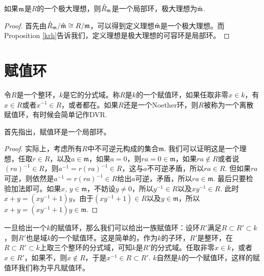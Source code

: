 
\begin{pro}
如果$\mathfrak{m}$是$R$的一个极大理想，则$\hat R_{\mathfrak{m}}$是一个局部环，极大理想为$\hat{\mathfrak{m}}$.
\end{pro}

\begin{proof}
	首先由$\hat R_{\mathfrak{m}}/\hat{\mathfrak{m}}\cong R/\mathfrak{m}$，可以得到定义理想$\hat {\mathfrak{m}}$是一个极大理想。而Proposition \ref{krh}告诉我们，定义理想是极大理想的可容环是局部环。
\end{proof}


\section{赋值环}

\para 令$R$是一个整环，$k$是它的分式域。称$R$是$k$的一个赋值环，如果任取非零$x\in k$，有$x\in R$或者$x^{-1}\in R$，或者都在。如果$R$还是一个Noether环，则$R$被称为一个离散赋值环，有时候会简单记作DVR.

首先指出，赋值环是一个局部环。

\begin{proof} 
	实际上，考虑所有$R$中不可逆元构成的集合$\mathfrak{m}$. 我们可以证明这是一个理想，任取$r\in R$，以及$a\in\mathfrak{m}$，如果$a=0$，则$ra=0\in \mathfrak{m}$，如果$ra\not\in R$或者说$(ra)^{-1}\in R$，则$a^{-1}=r(ra)^{-1}\in R$，这与$a$不可逆矛盾，所以$ra\in R$. 但如果$ra$可逆，则依然是$a^{-1}=r(ra)^{-1}\in R$给出$a$可逆，矛盾，所以$ra\in \mathfrak{m}$. 最后只要检验加法即可。如果$x$, $y\in\mathfrak{m}$，不妨设$y\neq 0$，所以$y^{-1}\in R$以及$xy^{-1}\in R$. 此时$x+y=(xy^{-1}+1)y$，由于$(xy^{-1}+1)\in R$以及$y\in\mathfrak{m}$，所以$x+y=(xy^{-1}+1)y\in \mathfrak{m}$.
\end{proof}

\para 一旦给出一个$k$的赋值环，那么我们可以给出一族赋值环：设环$R'$满足$R\subset R'\subset k$，则$R'$也是域$k$的一个赋值环。这是简单的，作为$k$的子环，$R'$是整环，在$R\subset R'\subset k$上取三个整环的分式域，可知$k$是$R'$的分式域。任取非零$x\in k$，或者$x\in R'$，如果不，则$x\not\in R$，于是$x^{-1}\in R\subset R'$. $k$自然是$k$的一个赋值环，这样的赋值环我们称为平凡赋值环。

